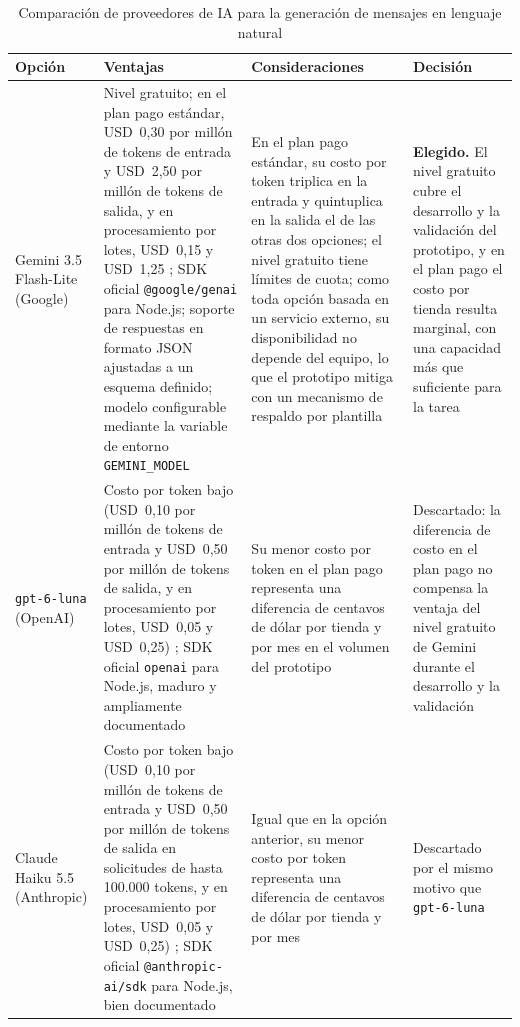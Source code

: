 \begin{table}[h]
\centering
\caption{Comparación de proveedores de IA para la generación de mensajes en lenguaje natural}
\label{tab:comparativo_llm}
\renewcommand{\arraystretch}{1.3}
\begin{tabular}{|m{2.3cm}|m{4.4cm}|m{4.4cm}|m{3.4cm}|}
\hline
\textbf{Opción} & \textbf{Ventajas} & \textbf{Consideraciones} & \textbf{Decisión} \\
\hline
Gemini 3.5 Flash-Lite (Google) & Nivel gratuito; en el plan pago estándar, USD~0,30 por millón de tokens de entrada y USD~2,50 por millón de tokens de salida, y en procesamiento por lotes, USD~0,15 y USD~1,25 \parencite{GoogleGeminiPricing2026}; SDK oficial \texttt{@google/genai} para Node.js; soporte de respuestas en formato JSON ajustadas a un esquema definido; modelo configurable mediante la variable de entorno \texttt{GEMINI\_MODEL} & En el plan pago estándar, su costo por token triplica en la entrada y quintuplica en la salida el de las otras dos opciones; el nivel gratuito tiene límites de cuota; como toda opción basada en un servicio externo, su disponibilidad no depende del equipo, lo que el prototipo mitiga con un mecanismo de respaldo por plantilla & \textbf{Elegido.} El nivel gratuito cubre el desarrollo y la validación del prototipo, y en el plan pago el costo por tienda resulta marginal, con una capacidad más que suficiente para la tarea \\
\hline
\texttt{gpt-6-luna} (OpenAI) & Costo por token bajo (USD~0,10 por millón de tokens de entrada y USD~0,50 por millón de tokens de salida, y en procesamiento por lotes, USD~0,05 y USD~0,25) \parencite{OpenAIPricing2026}; SDK oficial \texttt{openai} para Node.js, maduro y ampliamente documentado & Su menor costo por token en el plan pago representa una diferencia de centavos de dólar por tienda y por mes en el volumen del prototipo & Descartado: la diferencia de costo en el plan pago no compensa la ventaja del nivel gratuito de Gemini durante el desarrollo y la validación \\
\hline
Claude Haiku 5.5 (Anthropic) & Costo por token bajo (USD~0,10 por millón de tokens de entrada y USD~0,50 por millón de tokens de salida en solicitudes de hasta 100.000 tokens, y en procesamiento por lotes, USD~0,05 y USD~0,25) \parencite{AnthropicPricing2026}; SDK oficial \texttt{@anthropic-ai/sdk} para Node.js, bien documentado & Igual que en la opción anterior, su menor costo por token representa una diferencia de centavos de dólar por tienda y por mes & Descartado por el mismo motivo que \texttt{gpt-6-luna} \\
\hline
\end{tabular}
\end{table}

